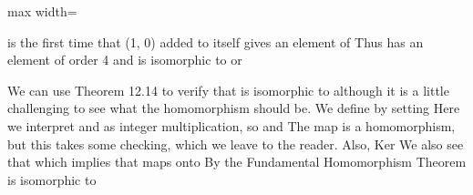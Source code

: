 \documentclass[11pt,oneside]{article}
\begin{document}
\begin{BookBody}
\begin{center}\begin{adjustbox}{max width=\linewidth}\end{adjustbox}\end{center}

\noindent is the first time that (1, 0) added to itself gives an element of  Thus  has an element of order 4 and is isomorphic to  or 

We can use Theorem 12.14 to verify that  is isomorphic to  although it is a little challenging to see what the homomorphism  should be. We define  by setting  Here we interpret  and  as integer multiplication, so  and  The map \BookInline{\phi } is a homomorphism, but this takes some checking, which we leave to the reader. Also, Ker We also see that  which implies that \BookInline{\phi } maps onto  By the Fundamental Homomorphism Theorem is isomorphic to \BookEnd{\blacktriangle}

\end{BookBody}

\BookNarrativetrue
\end{document}
